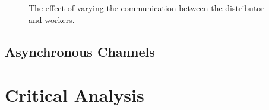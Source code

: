 \documentclass{article}
\begin{document}
    \begin{figure}[h]
        \begin{center}
            
            \caption{The effect of varying the communication between the distributor and workers.}
            \label{fig:hardsoftchannels}
        \end{center}
    \end{figure}

    \subsection{Asynchronous Channels} \label{asyncchannels}

    \pagebreak

    \section{Critical Analysis} \label{analysis}

\end{document}
